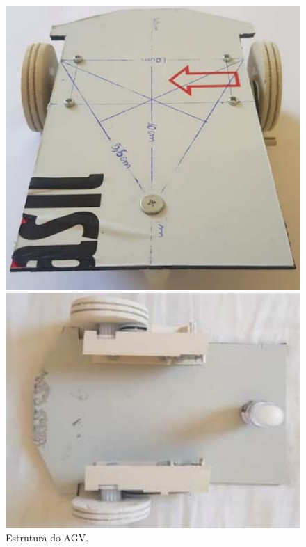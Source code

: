 \documentclass{textolivre}
\begin{document}
\begin{enumerate}
    \begin{figure}[h!]
    \begin{minipage}{0.47\textwidth}
    \includegraphics[width=\linewidth]{figure-08.pdf}
    \subcaption{}
    \end{minipage}
    \hfill
    \begin{minipage}{0.47\textwidth} 
    \includegraphics[width=\linewidth]{figure-09.pdf}
    \subcaption{}
    \end{minipage}
    \caption{Estrutura do AGV.}
    \label{fig04}
    \end{figure}
 
\end{enumerate}
\end{document}

